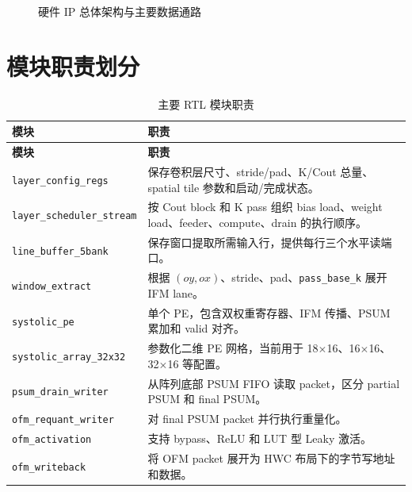 \documentclass[fontset=fandol,ugly,language=chinese]{pkuthss}
\newcommand{\module}[1]{\texttt{#1}}
\newcommand{\signal}[1]{\texttt{#1}}
\begin{document}
\begin{figure}[htbp]
{}
\caption{硬件 IP 总体架构与主要数据通路}
\label{fig:overall_arch_report}
\end{figure}

\section{模块职责划分}

\begin{longtable}{p{}p{}}
\caption{主要 RTL 模块职责}\\
\toprule
\textbf{模块} & \textbf{职责} \\
\midrule
\endfirsthead
\toprule
\textbf{模块} & \textbf{职责} \\
\midrule
\endhead
\module{layer\_config\_regs} & 保存卷积层尺寸、stride/pad、K/Cout 总量、spatial tile 参数和启动/完成状态。\\
\module{layer\_scheduler\_stream} & 按 Cout block 和 K pass 组织 bias load、weight load、feeder、compute、drain 的执行顺序。\\
\module{line\_buffer\_5bank} & 保存窗口提取所需输入行，提供每行三个水平读端口。\\
\module{window\_extract} & 根据 $(oy,ox)$、stride、pad、\signal{pass\_base\_k} 展开 IFM lane。\\
\module{systolic\_pe} & 单个 PE，包含双权重寄存器、IFM 传播、PSUM 累加和 valid 对齐。\\
\module{systolic\_array\_32x32} & 参数化二维 PE 网格，当前用于 18$\times$16、16$\times$16、32$\times$16 等配置。\\
\module{psum\_drain\_writer} & 从阵列底部 PSUM FIFO 读取 packet，区分 partial PSUM 和 final PSUM。\\
\module{ofm\_requant\_writer} & 对 final PSUM packet 并行执行重量化。\\
\module{ofm\_activation} & 支持 bypass、ReLU 和 LUT 型 Leaky 激活。\\
\module{ofm\_writeback} & 将 OFM packet 展开为 HWC 布局下的字节写地址和数据。\\
\bottomrule
\end{longtable}
\end{document}
